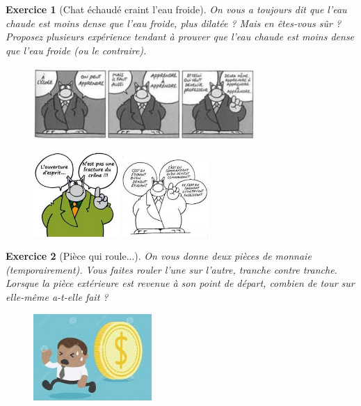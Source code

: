 \documentclass[12pt]{article}
\theoremstyle{break}
\newtheorem{exo}{Exercice}
\begin{document}
\begin{exo}[Chat échaudé craint l'eau froide]
On vous a toujours dit que l'eau chaude est moins dense que l'eau froide, plus dilatée ? Mais en êtes-vous sûr ? Proposez plusieurs expérience tendant à prouver que l'eau chaude est moins dense que l'eau froide (ou le contraire).

\begin{figure}[h!]
	\centering
    \includegraphics[width=0.75\textwidth]{LeChat1.jpg}
\end{figure}

\begin{figure}[h!]
	\centering
    \includegraphics[width=0.29\textwidth]{LeChat2.jpg}
    \includegraphics[width=0.29\textwidth]{LeChat3.jpg}
\end{figure}
\end{exo}


\begin{exo}[Pièce qui roule...]
On vous donne deux pièces de monnaie (temporairement). Vous faites rouler l'une sur l'autre, tranche contre tranche. Lorsque la pièce extérieure est revenue à son point de départ, combien de tour sur elle-même a-t-elle fait ?

\begin{figure}[h!]
	\centering
    \includegraphics[width=0.4\textwidth]{PieceDeMonnaie.jpg}
\end{figure}
\end{exo}
\end{document}
